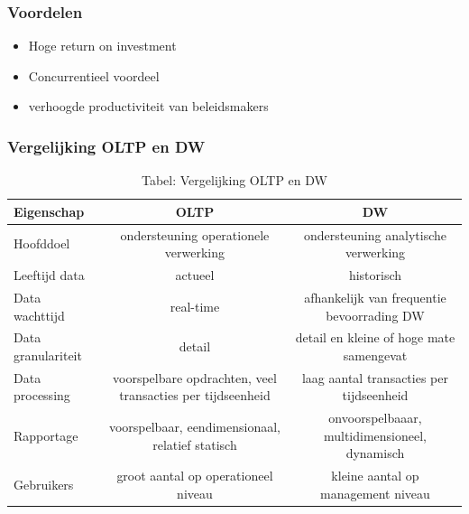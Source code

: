 \documentclass[a4paper,12pt]{article}
\begin{document}
\subsubsection{Voordelen}
\begin{itemize}
\item Hoge return on investment
\item Concurrentieel voordeel
\item verhoogde productiviteit van beleidsmakers
\end{itemize}

\subsubsection{Vergelijking OLTP en DW}
\begin{landscape}
\begin{table}[H]
\centering
\begin{tabular}{|l|c|c|}
\hline
Eigenschap&OLTP&DW\\
\hline
Hoofddoel & ondersteuning operationele verwerking & ondersteuning analytische verwerking\\
\hline
Leeftijd data & actueel & historisch\\
\hline
Data wachttijd & real-time & afhankelijk van frequentie bevoorrading DW\\
\hline
Data granulariteit & detail & detail en kleine of hoge mate samengevat\\
\hline
Data processing & voorspelbare opdrachten, veel transacties per tijdseenheid & laag aantal transacties per tijdseenheid\\
\hline
Rapportage & voorspelbaar, eendimensionaal, relatief statisch & onvoorspelbaaar, multidimensioneel, dynamisch\\
\hline
Gebruikers & groot aantal op operationeel niveau & kleine aantal op management niveau\\
\hline
\end{tabular}
\caption{Tabel: Vergelijking OLTP en DW}
\label{tab:VergelijkingOLTPenDW}
\end{table}
\end{landscape}
\end{document}
